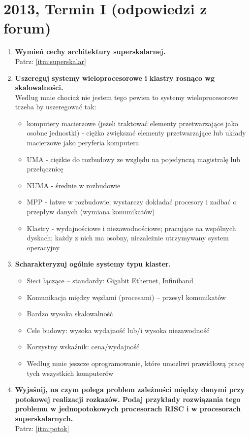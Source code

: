	\section{2013, Termin I (odpowiedzi z forum)}
		\begin{enumerate}	
			\item \textbf{Wymień cechy architektury superskalarnej.}\\
			Patrz: \ref{itm:superskalar}
			\item \textbf{Uszereguj systemy wieloprocesorowe i klastry rosnąco wg skalowalności.}\\
			Według mnie chociaż nie jestem tego pewien to systemy wieloprocesorowe trzeba by uszeregować tak:
			\begin{itemize}
				\item komputery macierzowe (jeżeli traktować elementy przetwarzające jako osobne jednostki) - ciężko zwiększać elementy przetwarzające lub układy macierzowe jako peryferia komputera
				\item UMA - ciężkie do rozbudowy ze względu na pojedynczą magistralę lub przełącznicę
				\item NUMA - średnie w rozbudowie
				\item MPP - łatwe w rozbudowie; wystarczy dokładać procesory i zadbać o przepływ danych (wymiana komunikatów)
				\item Klastry - wydajnościowe i niezawodnościowe; pracujące na wspólnych dyskach; każdy z nich ma osobny, niezależnie utrzymywany system operacyjny
			\end{itemize}
			\item \textbf{Scharakteryzuj ogólnie systemy typu klaster.}
			\begin{itemize}
				\item Sieci łączące – standardy: Gigabit Ethernet, Infiniband
				\item Komunikacja między węzłami (procesami) – przesył komunikatów
				\item Bardzo wysoka skalowalność
				\item Cele budowy: wysoka wydajność lub/i wysoka niezawodność
				\item Korzystny wskaźnik: cena/wydajność
				\item Według mnie jeszcze oprogramowanie, które umożliwi prawidłową pracę tych wszystkich komputerów
			\end{itemize}
			\item \textbf{Wyjaśnij, na czym polega problem zależności między danymi przy potokowej realizacji rozkazów. Podaj przykłady rozwiązania tego problemu w jednopotokowych procesorach RISC i w procesorach superskalarnych.}\\
			Patrz: \ref{itm:potok}
			

\end{enumerate}
